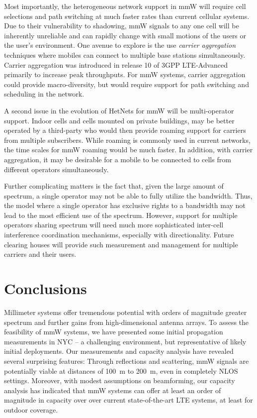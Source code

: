 \documentclass[journal]{IEEEtran}
\begin{document}
Most importantly, the heterogeneous network support in mmW will require
cell selections and path switching at much faster rates than current
cellular systems.
Due to their vulnerability to shadowing,
mmW signals to any one cell will be inherently unreliable and can rapidly
change with small motions of the users or the user's environment.
One avenue to explore is the use \emph{carrier aggregation} techniques \cite{3GPP36.300,YuanZWY:10} where mobiles can connect to multiple
base stations simultaneously.  Carrier aggregation was introduced in release 10 of 3GPP LTE-Advanced primarily to increase peak throughputs.
For mmW systems, carrier aggregation could provide macro-diversity,
but would require support for path switching and scheduling in the network.

A second issue in the evolution of HetNets for mmW will be multi-operator
support.  Indoor cells and cells mounted on private buildings, may be better operated
by a third-party who would then provide roaming support for carriers from multiple
subscribers.  While roaming is commonly used in current networks, the time scales
for mmW roaming would be much faster.  In addition, with carrier aggregation, it may
be desirable for a mobile to be connected to cells from different operators
simultaneously.

Further complicating matters is the fact that, given the large amount of spectrum,
a single operator may not be able to fully utilize the bandwidth.
Thus, the model where a single operator has exclusive rights to a bandwidth
may not lead to the most efficient use of the spectrum.  However, support for
multiple operators sharing spectrum will need much more sophisticated inter-cell
interference coordination mechanisms, especially with directionality.
Future clearing houses will provide such measurement and management
for multiple carriers and their users.


\section{Conclusions}

Millimeter systems offer tremendous potential with orders
of magnitude greater spectrum and further gains from high-dimensional
antenna arrays.
To assess the feasibility of mmW systems, we have presented some initial
propagation measurements in NYC -- a challenging environment, but representative
of likely initial deployments.  Our measurements and capacity analysis
have revealed several surprising features:  Through reflections and scattering,
mmW signals are potentially viable
at distances of 100~m to 200~m, even in completely NLOS settings.
Moreover, with modest assumptions on beamforming,
our capacity analysis has indicated that mmW systems can offer at least
an order of magnitude in capacity over over current state-of-the-art LTE
systems, at least for outdoor coverage.
\end{document}
